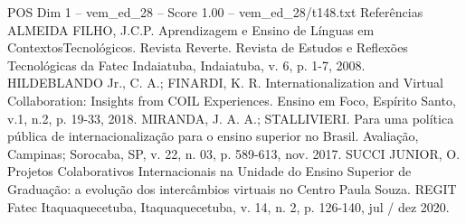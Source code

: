 \begin{textsample}{POS Dim 1 – vem\_ed\_28 – Score 1.00 – vem\_ed\_28/t148.txt}
Referências ALMEIDA FILHO, J.C.P.
Aprendizagem e Ensino de Línguas em ContextosTecnológicos.
Revista Reverte.
Revista de Estudos e Reflexões Tecnológicas da Fatec Indaiatuba, Indaiatuba, v. 6, p. 1-7, 2008.
HILDEBLANDO Jr., C.
A.; FINARDI, K.
R.
Internationalization and Virtual Collaboration: Insights from COIL Experiences.
Ensino em Foco, Espírito Santo, v.1, n.2, p. 19-33, 2018.
MIRANDA, J.
A.
A.; STALLIVIERI.
Para uma política pública de internacionalização para o ensino superior no Brasil.
Avaliação, Campinas; Sorocaba, SP, v. 22, n. 03, p. 589-613, nov. 2017.
SUCCI JUNIOR, O.
Projetos Colaborativos Internacionais na Unidade do Ensino Superior de Graduação: a evolução dos intercâmbios virtuais no Centro Paula Souza.
REGIT Fatec Itaquaquecetuba, Itaquaquecetuba, v. 14, n. 2, p. 126-140, jul / dez 2020.

\end{textsample}
